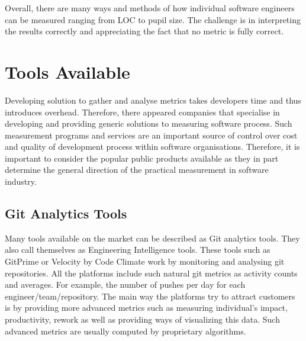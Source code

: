 \documentclass[11pt]{article}
\begin{document}
\par 
Overall, there are many ways and methods of how individual software engineers can be measured ranging from LOC to pupil size. The challenge is in interpreting the results correctly and appreciating the fact that no metric is fully correct. 



\section{Tools Available}
\label{sec:Platforms}
Developing solution to gather and analyse metrics takes developers time and thus introduces overhead. Therefore, there appeared companies that specialise in developing and providing generic solutions to measuring software process. Such measurement programs and services are an important source of control over cost and quality of development process within software organisations.\cite{ieee-measurement-programs} Therefore, it is important to consider the popular public products available as they in part determine the general direction of the practical measurement in software industry.

\subsection{Git Analytics Tools}
\par
Many tools available on the market can be described as Git analytics tools. They also call themselves as Engineering Intelligence tools. 
These tools such as GitPrime or Velocity by Code Climate work by monitoring and analysing git repositories. All the platforms include such natural git metrics as activity counts and averages. For example, the number of pushes per day for each engineer/team/repository. The main way the platforms try to attract customers is by providing more advanced metrics such as measuring individual's impact, productivity, rework as well as providing ways of visualizing this data. Such advanced metrics are usually computed by proprietary algorithms.
\end{document}
